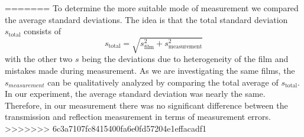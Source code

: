 =======
To determine the more suitable mode of measurement we compared the average standard deviations. The idea is that the total standard deviation $s_{\mathrm{total}}$ consists of
\begin{equation}
    s_{\mathrm{total}} = \sqrt{s_{\mathrm{film}}^2 + s_{\mathrm{measurement}}^2}
\end{equation}
with the other two $s$ being the deviations due to heterogeneity of the film and mistakes made during measurement. As we are investigating the same films, the $s_{measurement}$ can be qualitatively analyzed 
by comparing the total average of $s_{\mathrm{total}}$. In our experiment, the average standard deviation was nearly the same. Therefore, in our measurement there was no 
significant difference between the transmission and reflection measurement in terms of measurement errors.
>>>>>>> 6c3a7107fc8415400fa6e0fd57204e1effacadf1
%         
    

%            



%         

%            


